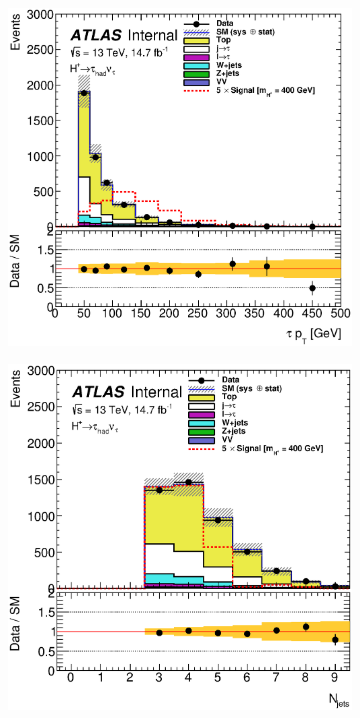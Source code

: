 \begin{figure}[!h]
\begin{subfigure}{0.5\textwidth}
					 \includegraphics[width=\textwidth]{figures/tauPt_SR.eps}
\end{subfigure}  
\begin{subfigure}{0.5\textwidth}
   \includegraphics[width=\textwidth]{figures/jets_SR.eps}

\end{subfigure}
\end{figure}
